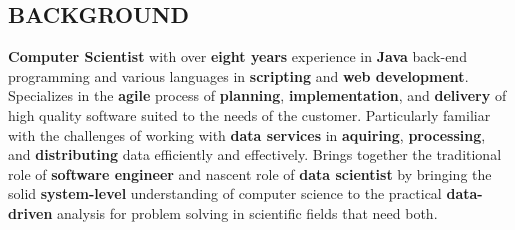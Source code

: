 \documentclass[line,margin]{res}
\begin{document}
\address{104 14th Street, Prairie du Sac, WI 53578}
\address{email: jordan@jordanwalker.us | phone: 608.370.1908}
 
\begin{resume}
 
\section{BACKGROUND}
	\textbf{Computer Scientist} with over \textbf{eight years} experience in \textbf{Java} back-end programming and various languages in \textbf{scripting} and \textbf{web development}.
	Specializes in the \textbf{agile} process of \textbf{planning}, \textbf{implementation}, and \textbf{delivery} of high quality software suited to the needs of the customer.
	Particularly familiar with the challenges of working with \textbf{data services} in \textbf{aquiring}, \textbf{processing}, and \textbf{distributing} data efficiently and effectively.
	Brings together the traditional role of \textbf{software engineer} and nascent role of \textbf{data scientist} by bringing the solid \textbf{system-level} understanding of computer science to the practical \textbf{data-driven} analysis for problem solving in scientific fields that need both.



\end{resume}
\end{document}
